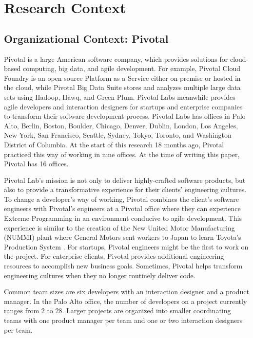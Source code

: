 \section{Research Context}
\label{ResearchContext}
\subsection{Organizational Context: Pivotal}
Pivotal is a large American software company, which provides solutions for cloud-based computing, big data, and agile development. For example, Pivotal Cloud Foundry is an open source Platform as a Service either on-premise or hosted in the cloud, while Pivotal Big Data Suite stores and analyzes multiple large data sets using Hadoop, Hawq, and Green Plum. Pivotal Labs meanwhile provides agile developers and interaction designers for startups and enterprise companies to transform their software development process. Pivotal Labs has offices in Palo Alto, Berlin, Boston, Boulder, Chicago, Denver, Dublin, London, Los Angeles, New York, San Francisco, Seattle, Sydney, Tokyo, Toronto, and Washington District of Columbia. At the start of this research 18 months ago, Pivotal practiced this way of working in nine offices. At the time of writing this paper, Pivotal has 16 offices. 

Pivotal Lab's mission is not only to deliver highly-crafted software products, but also to provide a transformative experience for their clients' engineering cultures. To change a developer's way of working, Pivotal combines the client's software engineers with Pivotal's engineers at a Pivotal office where they can experience Extreme Programming in an environment conducive to agile development. This experience is similar to the creation of the New United Motor Manufacturing (NUMMI) plant where General Motors sent workers to Japan to learn Toyota's Production System \cite{Nummi}. For startups, Pivotal engineers might be the first to work on the project. For enterprise clients, Pivotal provides additional engineering resources to accomplish new business goals. Sometimes, Pivotal helps transform engineering cultures when they no longer routinely deliver code.  

Common team sizes are six developers with an interaction designer and a product manager. In the Palo Alto office, the number of developers on a project currently ranges from 2 to 28. Larger projects are organized into smaller coordinating teams with one product manager per team and one or two interaction designers per team. 

